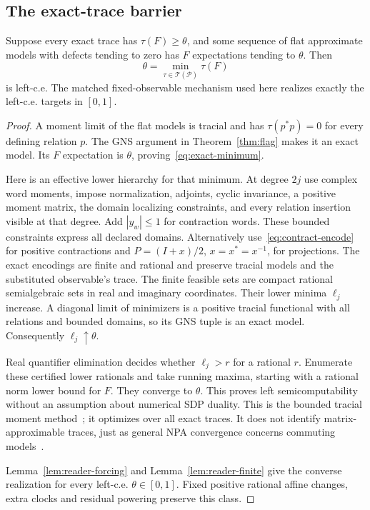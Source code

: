 \subsection{The exact-trace barrier}
\begin{proposition}\label{prop:exact-barrier}
Suppose every exact trace has $\tau(F)\ge\theta$, and some sequence of flat approximate models with defects tending to zero has $F$ expectations tending to $\theta$. Then
\begin{equation}\label{eq:exact-minimum}
 \theta=\min_{\tau\in\mathcal T(\mathcal P)}\tau(F)
\end{equation}
is left-c.e. The matched fixed-observable mechanism used here realizes exactly the left-c.e. targets in $[0,1]$.
\end{proposition}
\begin{proof}
A moment limit of the flat models is tracial and has $\tau(p^*p)=0$ for every defining relation $p$. The GNS argument in Theorem~\ref{thm:flag} makes it an exact model. Its $F$ expectation is $\theta$, proving~\eqref{eq:exact-minimum}.

Here is an effective lower hierarchy for that minimum. At degree $2j$ use complex word moments, impose normalization, adjoints, cyclic invariance, a positive moment matrix, the domain localizing constraints, and every relation insertion visible at that degree. Add $|y_w|\le1$ for contraction words. These bounded constraints express all declared domains. Alternatively use~\eqref{eq:contract-encode} for positive contractions and $P=(I+x)/2$, $x=x^*=x^{-1}$, for projections. The exact encodings are finite and rational and preserve tracial models and the substituted observable's trace. The finite feasible sets are compact rational semialgebraic sets in real and imaginary coordinates. Their lower minima $\ell_j$ increase. A diagonal limit of minimizers is a positive tracial functional with all relations and bounded domains, so its GNS tuple is an exact model. Consequently $\ell_j\uparrow\theta$.

Real quantifier elimination decides whether $\ell_j>r$ for a rational $r$. Enumerate these certified lower rationals and take running maxima, starting with a rational norm lower bound for $F$. They converge to $\theta$. This proves left semicomputability without an assumption about numerical SDP duality. This is the bounded tracial moment method~\cite{BK12,KMV22}; it optimizes over all exact traces. It does not identify matrix-approximable traces, just as general NPA convergence concerns commuting models~\cite{NPA08}.

Lemma~\ref{lem:reader-forcing} and Lemma~\ref{lem:reader-finite} give the converse realization for every left-c.e. $\theta\in[0,1]$. Fixed positive rational affine changes, extra clocks and residual powering preserve this class.
\end{proof}


